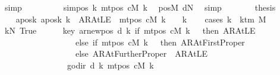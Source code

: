 \begin{isabellebody}
\ simp\isanewline
\ \ \ \ \isamarkupfalse%
\ \isamarkupfalse%
\ {\isachardoublequoteopen}{\isasymdots}\ {\isacharequal}{\kern0pt}\ sim{\isacharunderscore}{\kern0pt}pos\ {\isacharquery}{\kern0pt}k\ {\isacharparenleft}{\kern0pt}mt{\isacharunderscore}{\kern0pt}pos\ cM{\isacharunderscore}{\kern0pt}{}\ k{\isacharparenright}{\kern0pt}{\isachardoublequoteclose}\ \isamarkupfalse%
\ posM{}\ dN\ \isamarkupfalse%
\ simp\isanewline
\ \ \ \ \isamarkupfalse%
\ \isamarkupfalse%
\ {\isacharquery}{\kern0pt}thesis\ \isakeywordONE{{\isachardot}{\kern0pt}}\isamarkupfalse%
\isanewline
\ \ \isamarkupfalse%
\isanewline
\ \ \isamarkupfalse%
\ aposk{\isacharunderscore}{\kern0pt}{}{\isacharcolon}{\kern0pt}\ {\isachardoublequoteopen}{\isacharquery}{\kern0pt}aposk\ k\ {\isacharequal}{\kern0pt}\ AR{\isacharunderscore}{\kern0pt}AtLE\ {\isasymlongleftrightarrow}\ mt{\isacharunderscore}{\kern0pt}pos\ cM{\isacharunderscore}{\kern0pt}{}\ k\ {\isacharequal}{\kern0pt}\ {}{\isachardoublequoteclose}\ \ k\isanewline
\ \ \isamarkupfalse%
\ {\isacharparenleft}{\kern0pt}cases\ {\isachardoublequoteopen}k\ {\isacharless}{\kern0pt}\ k{\isacharunderscore}{\kern0pt}tm\ M{\isachardoublequoteclose}{\isacharparenright}{\kern0pt}\isanewline
\ \ \ \ \isamarkupfalse%
\ kN{\isacharcolon}{\kern0pt}\ True\isanewline
\ \ \ \ \isamarkupfalse%
\ key{\isacharcolon}{\kern0pt}\ {\isachardoublequoteopen}{\isacharparenleft}{\kern0pt}ar{\isacharunderscore}{\kern0pt}newpos\ {\isacharparenleft}{\kern0pt}d\ k{\isacharparenright}{\kern0pt}\ {\isacharparenleft}{\kern0pt}if\ mt{\isacharunderscore}{\kern0pt}pos\ cM\ k\ {\isacharequal}{\kern0pt}\ {}\ then\ AR{\isacharunderscore}{\kern0pt}AtLE\isanewline
\ \ \ \ \ \ \ \ \ \ \ \ \ \ \ \ \ \ else\ if\ mt{\isacharunderscore}{\kern0pt}pos\ cM\ k\ {\isacharequal}{\kern0pt}\ {}\ then\ AR{\isacharunderscore}{\kern0pt}AtFirstProper\isanewline
\ \ \ \ \ \ \ \ \ \ \ \ \ \ \ \ \ \ else\ AR{\isacharunderscore}{\kern0pt}AtFurtherProper{\isacharparenright}{\kern0pt}\ {\isacharequal}{\kern0pt}\ AR{\isacharunderscore}{\kern0pt}AtLE{\isacharparenright}{\kern0pt}\isanewline
\ \ \ \ \ \ \ \ \ \ \ \ \ \ \ {\isasymlongleftrightarrow}\ go{\isacharunderscore}{\kern0pt}dir\ {\isacharparenleft}{\kern0pt}d\ k{\isacharparenright}{\kern0pt}\ {\isacharparenleft}{\kern0pt}mt{\isacharunderscore}{\kern0pt}pos\ cM\ k{\isacharparenright}{\kern0pt}\ {\isacharequal}{\kern0pt}\ {}{\isachardoublequoteclose}\isanewline

\end{isabellebody}
